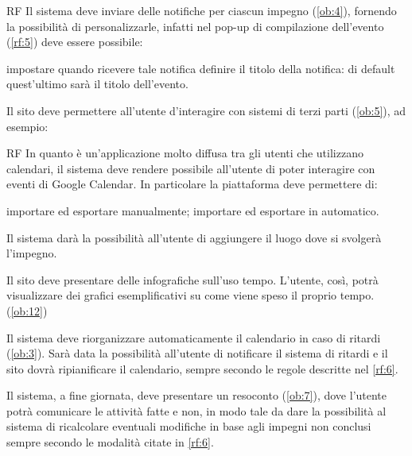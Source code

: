 \begin{listaPersonale}{RF}
	 Il sistema deve inviare delle notifiche per ciascun impegno (\ref{ob:4}), fornendo la possibilità di personalizzarle, infatti nel pop-up di compilazione dell'evento (\ref{rf:5}) deve essere possibile:
	\begin{listaPersonale2}{}
		 impostare quando ricevere tale notifica
		 definire il titolo della notifica: di default quest'ultimo sarà il titolo dell'evento.
	\end{listaPersonale2}

	 Il sito deve permettere all'utente d'interagire con sistemi di terzi parti (\ref{ob:5}), ad esempio:

	\begin{listaPersonale2}{RF}
		 In quanto è un'applicazione molto diffusa tra gli utenti che utilizzano calendari, il sistema deve rendere possibile all'utente di poter interagire con eventi di Google Calendar. In particolare la piattaforma deve permettere di:
		\begin{listaPersonale3}{}
			 importare ed esportare manualmente;
			 importare ed esportare in automatico.
		\end{listaPersonale3}

		 Il sistema darà la possibilità all'utente di aggiungere il luogo dove si svolgerà l'impegno.
	\end{listaPersonale2}

	 Il sito deve presentare delle infografiche sull'uso tempo. L'utente, così, potrà visualizzare dei grafici esemplificativi su come viene speso il proprio tempo. (\ref{ob:12})

	 Il sistema deve riorganizzare automaticamente il calendario in caso di ritardi (\ref{ob:3}). Sarà data la possibilità all'utente di notificare il sistema di ritardi e il sito dovrà ripianificare il calendario, sempre secondo le regole descritte nel \ref{rf:6}.

	 Il sistema, a fine giornata, deve presentare un resoconto (\ref{ob:7}), dove l'utente potrà comunicare le attività fatte e non, in modo tale da dare la possibilità al sistema di ricalcolare eventuali modifiche in base agli impegni non conclusi sempre secondo le modalità citate in \ref{rf:6}.


\end{listaPersonale}
